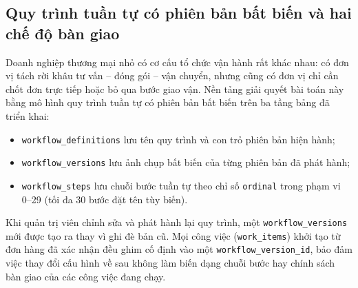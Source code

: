 \subsection{Quy trình tuần tự có phiên bản bất biến và hai chế độ bàn giao}
Doanh nghiệp thương mại nhỏ có cơ cấu tổ chức vận hành rất khác nhau: có đơn vị tách rời khâu tư vấn -- đóng gói -- vận chuyển, nhưng cũng có đơn vị chỉ cần chốt đơn trực tiếp hoặc bỏ qua bước
giao vận. Nền tảng giải quyết bài toán này bằng mô hình quy trình tuần tự có phiên bản bất biến trên ba tầng bảng đã triển khai:
\begin{itemize}
  \item \texttt{workflow\_\hspace{0pt}definitions} lưu tên quy trình và con trỏ phiên bản hiện hành;
  \item \texttt{workflow\_\hspace{0pt}versions} lưu ảnh chụp bất biến của từng phiên bản đã phát hành;
  \item \texttt{workflow\_\hspace{0pt}steps} lưu chuỗi bước tuần tự theo chỉ số \texttt{ordinal} trong phạm vi 0--29 (tối đa 30 bước đặt tên tùy biến).
\end{itemize}
Khi quản trị viên chỉnh sửa và phát hành lại quy trình, một \texttt{workflow\_\hspace{0pt}versions} mới được tạo ra thay vì ghi đè bản cũ. Mọi công việc (\texttt{work\_\hspace{0pt}items}) khởi tạo từ đơn hàng đã xác
nhận đều ghim cố định vào một \texttt{workflow\_\hspace{0pt}version\_\hspace{0pt}id}, bảo đảm việc thay đổi cấu hình về sau không làm biến dạng chuỗi bước hay chính sách bàn giao của các công việc đang chạy.

